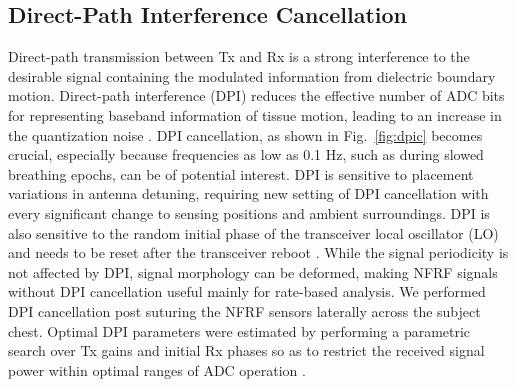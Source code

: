 \documentclass[journal]{IEEEtran}
\begin{document}
\subsection{Direct-Path Interference Cancellation}
Direct-path transmission between Tx and Rx is a strong interference to the desirable signal containing the modulated information from dielectric boundary motion. Direct-path interference (DPI) reduces the effective number of ADC bits for representing baseband information of tissue motion, leading to an increase in the quantization noise \cite{zhouMorphologyTransformationContent2022}\cite{kuo_fully_2016}. DPI cancellation, as shown in Fig.~\ref{fig:dpic} becomes crucial, especially because frequencies as low as 0.1 Hz, such as during slowed breathing epochs, can be of potential interest. DPI is sensitive to placement variations in antenna detuning, requiring new setting of DPI cancellation with every significant change to sensing positions and ambient surroundings. DPI is also sensitive to the random initial phase of the transceiver local oscillator (LO) and needs to be reset after the transceiver reboot \cite{xuPhaseOffsetCalibration2024}. While the signal periodicity is not affected by DPI, signal morphology can be deformed, making NFRF signals without DPI cancellation useful mainly for rate-based analysis.
We performed DPI cancellation post suturing the NFRF sensors laterally across the subject chest. Optimal DPI parameters were estimated by performing a parametric search over Tx gains and initial Rx phases so as to restrict the received signal power within optimal ranges of ADC operation \cite{huiNearFieldCoherentSensing2021}.
\end{document}
